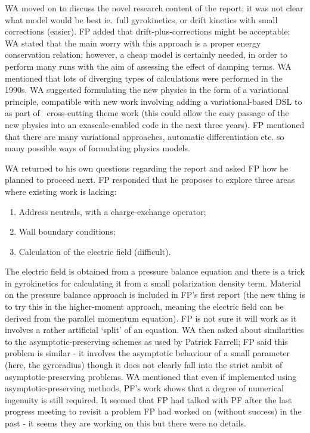 WA moved on to discuss the novel research content of the report; it was not 
clear what model would be best ie.\ full gyrokinetics, or drift kinetics with 
small corrections (easier).  FP added that drift-plus-corrections might be 
acceptable; WA stated that the main worry with this approach is a proper energy 
conservation relation; however, a cheap model is certainly needed, in order to 
perform many runs with the aim of assessing the effect of damping terms.  WA 
mentioned that lots of diverging types of calculations were performed in the 
1990s.  WA suggested formulating the new physics in the form of a variational 
principle, compatible with new work involving adding a variational-based DSL to 
 as part of \exc\  cross-cutting theme work (this could allow 
the easy passage of the new physics into an exascale-enabled code in the next 
three years).  FP mentioned that there are many variational approaches, 
automatic differentiation etc. so many possible ways of formulating physics 
models.

WA returned to his own questions regarding the report and asked FP how he 
planned to proceed next.  FP responded that he proposes to explore three areas 
where existing work is lacking:
\begin{enumerate}
\item Address neutrals, with a charge-exchange operator;
\item Wall boundary conditions;
\item Calculation of the electric field (difficult).
\end{enumerate}

The electric field is obtained from a pressure balance equation and there is a 
trick in gyrokinetics for calculating it from a small polarization density 
term.  Material on the pressure balance approach is included in FP's first 
report (the new thing is to try this in the higher-moment approach, meaning the 
electric field can be derived from the parallel momentum equation).  FP is not 
sure it will work as it involves a rather artificial `split' of an equation.  
WA then asked about similarities to the asymptotic-preserving schemes as used 
by Patrick Farrell; FP said this problem is similar - it involves the 
asymptotic behaviour of a small parameter (here, the gyroradius) though it does 
not clearly fall into the strict ambit of asymptotic-preserving problems.  WA 
mentioned that even if implemented using asymptotic-preserving methods, PF's 
work shows that a degree of numerical ingenuity is still required.  It seemed 
that FP had talked with PF after the last progress meeting to revisit a 
problem FP had worked on (without success) in the past - it seems they are 
working on this but there were no details.

